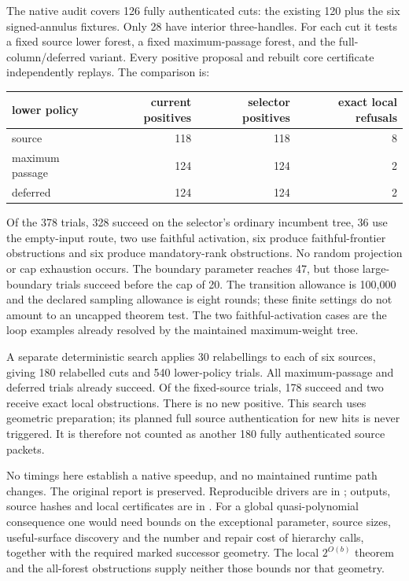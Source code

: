 The native audit covers 126 fully authenticated cuts: the existing 120 plus
the six signed-annulus fixtures.  Only 28 have interior three-handles.
For each cut it tests a fixed source lower forest, a fixed maximum-passage
forest, and the full-column/deferred variant.  Every positive proposal and
rebuilt core certificate independently replays.  The comparison is:
\begin{center}
\begin{tabular}{lrrr}
lower policy & current positives & selector positives & exact local refusals\\
\hline
source &118&118&8\\
maximum passage &124&124&2\\
deferred &124&124&2
\end{tabular}
\end{center}
Of the 378 trials, 328 succeed on the selector's ordinary incumbent tree,
36 use the empty-input route, two use faithful activation, six produce
faithful-frontier obstructions and six produce mandatory-rank obstructions.
No random projection or cap exhaustion occurs.  The boundary parameter
reaches 47, but those large-boundary trials succeed before the cap of 20.
The transition allowance is 100,000 and the declared sampling allowance
is eight rounds; these finite settings do not amount to an uncapped theorem
test.  The two faithful-activation cases are the loop examples already
resolved by the maintained maximum-weight tree.

A separate deterministic search applies 30 relabellings to each of six
sources, giving 180 relabelled cuts and 540 lower-policy trials.  All
maximum-passage and deferred trials already succeed.  Of the fixed-source
trials, 178 succeed and two receive exact local obstructions.  There is no
new positive.  This search uses geometric preparation; its planned full
source authentication for new hits is never triggered.  It is therefore
not counted as another 180 fully authenticated source packets.

No timings here establish a native speedup, and no maintained runtime path
changes.  The original report is preserved.  Reproducible drivers are in
; outputs, source hashes and local
certificates are in .
For a global quasi-polynomial consequence one would need bounds on the
exceptional parameter, source sizes, useful-surface discovery and the
number and repair cost of hierarchy calls, together with the required
marked successor geometry.  The local $2^{O(b)}$ theorem and the all-forest
obstructions supply neither those bounds nor that geometry.
